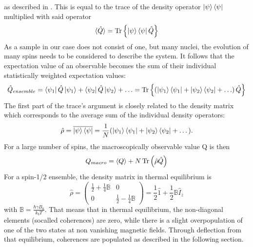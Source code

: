             as described in \cite{sakurai_modern_2017}. This is equal to the trace of the density operator
            $\ket\psi\bra\psi$ multiplied with said operator \cite{levitt_spin_nodate}
            \begin{equation}
                \braket{\hat Q} = \operatorname{Tr} \left\{\ket\psi\bra\psi\hat Q\right\}
            \end{equation}
            As a sample in our case does not consist of one, but many nuclei, the evolution of many spins needs to be considered to describe the system. 
            It follows that the expectation value of an observable becomes the sum of their individual statistically weighted expectation values:
            \begin{equation}
                \hat Q_{ensemble}= \bra{\psi_1}\hat Q\ket{\psi_1} + \bra{\psi_2}\hat Q\ket{\psi_2} + \hdots =
                \operatorname{Tr}{\left\{\left(\ket{\psi_1}\bra{\psi_1} + \ket{\psi_2}\bra{\psi_2}+ \hdots \right) \hat Q\right\}}
            \end{equation}
            The first part of the trace's argument is closely related to the density matrix which corresponds to the average sum of the individual density operators:
            \begin{equation}
                \hat\rho = \overline{\ket\psi\bra\psi} = \frac{1}{N} (\ket{\psi_1}\bra{\psi_1} + \ket{\psi_2}\bra{\psi_2} + \dots).
            \end{equation}
            For a large number of spins, the macroscopically observable value Q is then
            \begin{equation}
                Q_{macro} = \left< Q \right> + N \operatorname{Tr} \left( \hat{\rho} \hat{Q}\right)
            \end{equation}
            For a spin-1/2 ensemble, the density matrix in thermal equilibrium is
            \begin{equation}
                \hat \rho = \begin{pmatrix} \frac{1}{2}+\frac{1}{4}\mathbb{B}& 0\\ 0&
                \frac{1}{2}-\frac{1}{4}\mathbb{B}\end{pmatrix} = \frac {1}{2} \hat1 + \frac{1}{2} \mathbb{B}
                \hat I_z
            \end{equation}
            with $\mathbb{B} = \frac{\hbar\gamma B_0}{k_b T}$. That means that in thermal equilibrium, the non-diagonal elements (socalled coherences) are zero, while there is a slight overpopulation of one of the two states at non vanishing magnetic fields. Through deflection from that equilibrium, coherences are populated as described in the following section.
